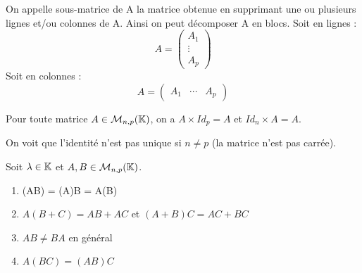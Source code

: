 \documentclass[a4paper, 12pt]{article}
\begin{document}
\begin{definition}
    On appelle sous-matrice de A la matrice obtenue en supprimant une ou plusieurs lignes et/ou colonnes de A.
    Ainsi on peut décomposer A en blocs.
    Soit en lignes :
    $$
        A = \begin{pmatrix}
            A_1 \\
            \vdots \\
            A_p
        \end{pmatrix}
    $$
    Soit en colonnes :
    $$
        A = \begin{pmatrix}
            A_1 & \cdots & A_p
        \end{pmatrix}
    $$
\end{definition}

\begin{proprietes}
    Pour toute matrice $A \in \mathcal{M}_{n, p}(\mathbb{K})$, on a
    $A \times Id_p = A$ et $Id_n \times A = A$.
\end{proprietes}

\begin{remark}
    On voit que l'identité n'est pas unique si $n \neq p$ (la matrice n'est pas carrée).
\end{remark}

\begin{proprietes}
    Soit $\lambda \in \mathbb{K}$ et $A, B \in \mathcal{M}_{n, p}(\mathbb{K})$.
    \begin{enumerate}
        \item \lambda(AB) = (\lambda A)B = A(\lambda B)
        \item $A(B + C) = AB + AC$ et $(A + B)C = AC + BC$
        \item $AB \neq BA$ en général
        \item $A(BC) = (AB)C$
    \end{enumerate}
\end{proprietes}
\end{document}
